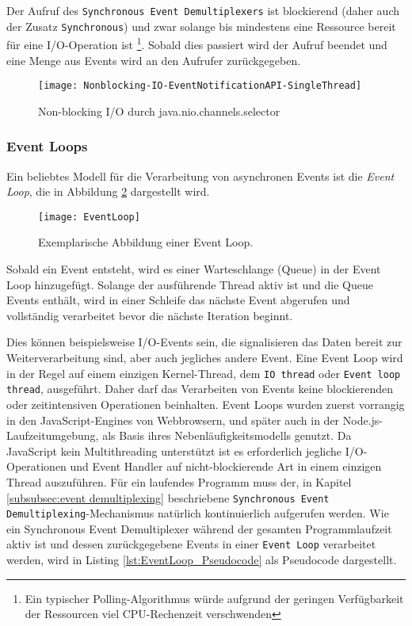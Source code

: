 Der Aufruf des \verb|Synchronous Event Demultiplexers| ist blockierend (daher auch der Zusatz \verb|Synchronous|)
und zwar solange bis mindestens eine Ressource bereit für eine I/O-Operation ist
\footnote{Ein typischer Polling-Algorithmus würde aufgrund der geringen Verfügbarkeit der Ressourcen
  viel CPU-Rechenzeit verschwenden}.
Sobald dies passiert wird der Aufruf beendet und eine Menge aus Events wird an den Aufrufer zurückgegeben.
\begin{figure}[ht!]
  \centering
  \texttt{[image: Nonblocking-IO-EventNotificationAPI-SingleThread]}
  \caption{Non-blocking I/O durch java.nio.channels.selector \parencite{NettyInAction}}
  \label{fig:nonblocking_single_thread}
\end{figure}

\subsubsection{Event Loops}
\label{subsubsec:event loops}
Ein beliebtes Modell für die Verarbeitung von asynchronen Events ist die \textit{Event Loop}, die in Abbildung \ref{fig:eventloop} dargestellt wird.
\begin{figure}[ht!]
  \centering
  \texttt{[image: EventLoop]}
  \caption{Exemplarische Abbildung einer Event Loop. \parencite[Kapitel 1.7]{Ponge2020}}
  \label{fig:eventloop}
\end{figure}

Sobald ein Event entsteht, wird es einer Warteschlange (Queue) in der Event Loop hinzugefügt.
Solange der ausführende Thread aktiv ist und die Queue Events enthält, wird in einer Schleife das nächste Event
abgerufen und vollständig verarbeitet bevor die nächste Iteration beginnt.

Dies können beispielsweise I/O-Events sein, die signalisieren das Daten bereit zur Weiterverarbeitung sind,
aber auch jegliches andere Event.
Eine Event Loop wird in der Regel auf einem einzigen Kernel-Thread, dem \verb|IO thread| oder \verb|Event loop thread|,
ausgeführt. Daher darf das Verarbeiten von Events keine blockierenden oder zeitintensiven Operationen beinhalten.
Event Loops wurden zuerst vorrangig in den JavaScript-Engines von Webbrowsern,
und später auch in der Node.js-Laufzeitumgebung, als Basis ihres Nebenläufigkeitsmodells genutzt.
Da JavaScript kein Multithreading unterstützt \parencite{MozillaEventLoop} ist es erforderlich jegliche I/O-Operationen und
Event Handler auf nicht-blockierende Art in einem einzigen Thread auszuführen.\parencite{NodeJSEventLoop}
Für ein laufendes Programm muss der, in Kapitel \ref{subsubsec:event demultiplexing} beschriebene
\newline
\verb|Synchronous Event Demultiplexing|-Mechanismus natürlich kontinuierlich aufgerufen werden.
Wie ein Synchronous Event Demultiplexer während der
gesamten Programmlaufzeit aktiv ist und dessen zurückgegebene Events in einer \verb|Event Loop| verarbeitet werden,
wird in Listing \ref{lst:EventLoop_Pseudocode} als Pseudocode dargestellt.
\newline

